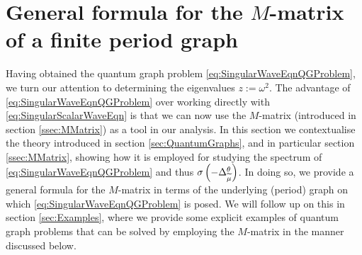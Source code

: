 \section{General formula for the $M$-matrix of a finite period graph} \label{sec:ScalarDiscussion}
Having obtained the quantum graph problem \eqref{eq:SingularWaveEqnQGProblem}, we turn our attention to determining the eigenvalues $z := \omega^2$.
The advantage of \eqref{eq:SingularWaveEqnQGProblem} over working directly with \eqref{eq:SingularScalarWaveEqn} is that we can now use the $M$-matrix (introduced in section \ref{ssec:MMatrix}) as a tool in our analysis.
In this section we contextualise the theory introduced in section \ref{sec:QuantumGraphs}, and in particular section \ref{ssec:MMatrix}, showing how it is employed for studying the spectrum of \eqref{eq:SingularWaveEqnQGProblem} and thus $\sigma\left( -\Delta_{\widetilde{\mu}}^{\theta} \right)$.
In doing so, we provide a general formula for the $M$-matrix in terms of the underlying (period) graph on which \eqref{eq:SingularWaveEqnQGProblem} is posed.
We will follow up on this in section \ref{sec:Examples}, where we provide some explicit examples of quantum graph problems that can be solved by employing the $M$-matrix in the manner discussed below.

